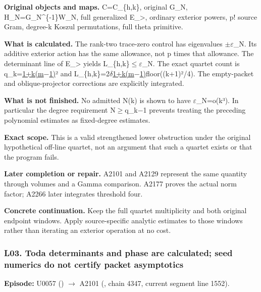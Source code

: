 \textbf{Original objects and maps.} C=C\_\{h,k\}, original G\_N,
H\_N=G\_N\^{}\{-1\}W\_N, full generalized E\_\textgreater, ordinary
exterior powers, p! source Gram, degree-k Koszul permutations, full
theta primitive.

\textbf{What is calculated.} The rank-two trace-zero control has
eigenvalues
\allowbreak{}\ensuremath{±}\allowbreak{}\allowbreak{}\ensuremath{ε}\allowbreak{}\_N.
Its additive exterior action has the same allowance, not p times that
allowance. The determinant line of E\_\textgreater{} yields
L\_\{h,k\}\allowbreak{}\ensuremath{≤}\allowbreak{}\allowbreak{}\ensuremath{ε}\allowbreak{}\_N.
The exact quartet count is
q\_k=\href{k+1}{1+k(m\allowbreak{}\ensuremath{−}\allowbreak{}1)}² and
L\_\{h,k\}=2\allowbreak{}\ensuremath{δ}\allowbreak{}\href{k+1}{1+k(m\allowbreak{}\ensuremath{−}\allowbreak{}1)}floor((k+1)²/4).
The empty-packet and oblique-projector corrections are explicitly
integrated.

\textbf{What is not finished.} No admitted N(k) is shown to have
\allowbreak{}\ensuremath{ε}\allowbreak{}\_N=o(k³). In particular the
degree requirement
N\allowbreak{}\ensuremath{≥}\allowbreak{}q\_k\allowbreak{}\ensuremath{−}\allowbreak{}1
prevents treating the preceding polynomial estimates as fixed-degree
estimates.

\textbf{Exact scope.} This is a valid strengthened lower obstruction
under the original hypothetical off-line quartet, not an argument that
such a quartet exists or that the program fails.

\textbf{Later completion or repair.} A2101 and A2129 represent the same
quantity through volumes and a Gamma comparison. A2177 proves the actual
norm factor; A2266 later integrates threshold four.

\textbf{Concrete continuation.} Keep the full quartet multiplicity and
both original endpoint windows. Apply source-specific analytic estimates
to those windows rather than iterating an exterior operation at no cost.

\subsubsection{L03. Toda determinants and phase are calculated; seed
numerics do not certify packet
asymptotics}\label{l03.-toda-determinants-and-phase-are-calculated-seed-numerics-do-not-certify-packet-asymptotics}

\textbf{Episode:} U0057
(\protect{})
\allowbreak{}\ensuremath{→}\allowbreak{} A2101
(\protect{}, chain 4347,
current segment line 1552).

